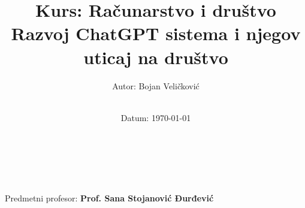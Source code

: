\title{\Large Kurs: Računarstvo i društvo  \\[0.5cm]
        \bf\Large Razvoj ChatGPT sistema i njegov uticaj na društvo}
\author{\large Autor: Bojan Veličković\\ \ \\}
\date{\large Datum: \today}

\makeatletter
    \begin{titlepage}
        \begin{center}
	    {\ \\ \ \\}
        \vbox{}\vspace{5cm}
            {\@title }\\[3cm] 
            {\@author}
            {\large Predmetni profesor: \bf Prof. Sana Stojanović Đurđević\\  \ \\}
            {\@date\\}

        \end{center}
    \end{titlepage}
\makeatother
